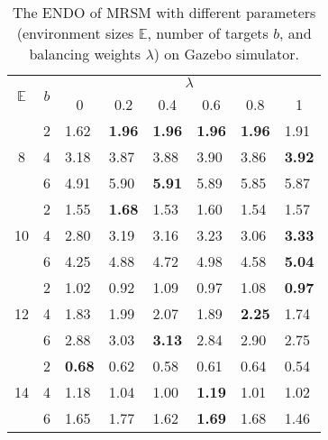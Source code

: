   \begin{table}[]
    \centering
    \caption{The ENDO of MRSM with different parameters (environment sizes $\mathbb{E}$, number of targets $b$, and balancing weights $\lambda$) on Gazebo simulator.}
    \label{tab:ENDO-Env-lambda}
    \begin{tabular}{ccllllll}
    \hline
    \multirow{2}{*}{$\mathbb{E}$} & \multirow{2}{*}{$b$} & \multicolumn{6}{c}{$\lambda$}                                                                 \\ \cline{3-8}
     &
       &
      \multicolumn{1}{c}{0} &
      \multicolumn{1}{c}{0.2} &
      \multicolumn{1}{c}{0.4} &
      \multicolumn{1}{c}{0.6} &
      \multicolumn{1}{c}{0.8} &
      \multicolumn{1}{c}{1} \\ \hline
    \multirow{3}{*}{8} &
      2 &
      1.62 &
      \textbf{1.96} &
      \textbf{1.96} &
      \textbf{1.96} &
      \textbf{1.96} &
      1.91 \\
                         & 4                    & 3.18          & 3.87          & 3.88          & 3.90          & 3.86          & \textbf{3.92} \\
                         & 6                    & 4.91          & 5.90          & \textbf{5.91} & 5.89          & 5.85          & 5.87          \\ \hline
    \multirow{3}{*}{10}  & 2                    & 1.55          & \textbf{1.68} & 1.53          & 1.60          & 1.54          & 1.57          \\
                         & 4                    & 2.80          & 3.19          & 3.16          & 3.23          & 3.06          & \textbf{3.33} \\
                         & 6                    & 4.25          & 4.88          & 4.72          & 4.98          & 4.58          & \textbf{5.04} \\ \hline
    \multirow{3}{*}{12}  & 2                    & 1.02          & 0.92          & 1.09          & 0.97          & 1.08          & \textbf{0.97} \\
                         & 4                    & 1.83          & 1.99          & 2.07          & 1.89          & \textbf{2.25} & 1.74          \\
                         & 6                    & 2.88          & 3.03          & \textbf{3.13} & 2.84          & 2.90          & 2.75          \\ \hline
    \multirow{3}{*}{14}  & 2                    & \textbf{0.68} & 0.62          & 0.58          & 0.61          & 0.64          & 0.54          \\
                         & 4                    & 1.18          & 1.04          & 1.00          & \textbf{1.19} & 1.01          & 1.02          \\
                         & 6                    & 1.65          & 1.77          & 1.62          & \textbf{1.69} & 1.68          & 1.46          \\ \hline
    \end{tabular}
    \end{table}



